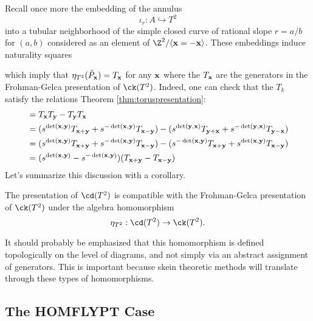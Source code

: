 Recall once more the embedding of the annulus
\[
\iota_r: A \hookrightarrow T^2
\]
into a tubular neighborhood of the simple closed curve of rational slope $r=a/b$ for $(a, b)$ considered as an element of $\Z^2 / \langle \xx = - \xx \rangle$. These embeddings induce naturality squares
\begin{center}
\end{center}
which imply that $\eta_{T^2}(\tilde{P}_{\mathbf{x}}) = T_{\mathbf{x}}$ for any ${\mathbf{x}}$ where the $T_{\mathbf{x}}$ are the generators in the Frohman-Gelca presentation of $\ck(T^2)$. Indeed, one can check that the $T_k$ satisfy the relations Theorem \ref{thm:toruspresentation}:
\begin{align*}
[T_\xx, T_\yy] &= T_\xx T_\yy - T_\yy T_\xx \\
&= (s^{\det(\xx, \yy)} T_{\xx + \yy} + s^{-\det(\xx, \yy)} T_{\xx - \yy}) - (s^{\det(\yy, \xx)} T_{\yy + \xx} + s^{-\det(\yy, \xx)} T_{\yy - \xx}) \\
&= (s^{\det(\xx, \yy)} T_{\xx + \yy} + s^{-\det(\xx, \yy)} T_{\xx - \yy}) - (s^{-\det(\xx, \yy)} T_{\xx + \yy} + s^{\det(\xx, \yy)} T_{\xx - \yy}) \\
&= (s^{\det(\xx, \yy)} - s^{-\det(\xx, \yy)}) (T_{\xx + \yy} - T_{\xx - \yy})
\end{align*}
Let's summarize this discussion with a corollary.
\begin{corollary}
The presentation of $\cd(T^2)$ is compatible with the Frohman-Gelca presentation of $\ck(T^2)$ under the algebra homomorphism
\[
\eta_{T^2}: \cd(T^2) \to \ck(T^2).
\]
\end{corollary}

It should probably be emphasized that this homomorphism is defined topologically on the level of diagrams, and not simply via an abstract assignment of generators. This is important because skein theoretic methods will translate through these types of homomorphisms. 


\subsection{The HOMFLYPT Case}





